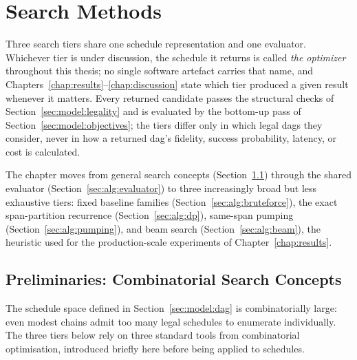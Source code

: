 \chapter{Search Methods}
\label{chap:algorithms}



Three search tiers share one schedule representation and one evaluator. Whichever tier is under discussion, the schedule it returns is called \emph{the optimizer} throughout this thesis; no single software artefact carries that name, and Chapters~\ref{chap:results}--\ref{chap:discussion} state which tier produced a given result whenever it matters. Every returned candidate passes the structural checks of Section~\ref{sec:model:legality} and is evaluated by the bottom-up pass of Section~\ref{sec:model:objectives}; the tiers differ only in which legal \Glspl{dag} they consider, never in how a returned \Gls{dag}'s fidelity, success probability, latency, or cost is calculated.

The chapter moves from general search concepts (Section~\ref{sec:alg:prelims}) through the shared evaluator (Section~\ref{sec:alg:evaluator}) to three increasingly broad but less exhaustive tiers: fixed baseline families (Section~\ref{sec:alg:bruteforce}), the exact span-partition recurrence (Section~\ref{sec:alg:dp}), same-span pumping (Section~\ref{sec:alg:pumping}), and beam search (Section~\ref{sec:alg:beam}), the heuristic used for the production-scale experiments of Chapter~\ref{chap:results}.

\section{Preliminaries: Combinatorial Search Concepts}
\label{sec:alg:prelims}

The schedule space defined in Section~\ref{sec:model:dag} is combinatorially large: even modest chains admit too many legal schedules to enumerate individually. The three tiers below rely on three standard tools from combinatorial optimisation, introduced briefly here before being applied to schedules.

